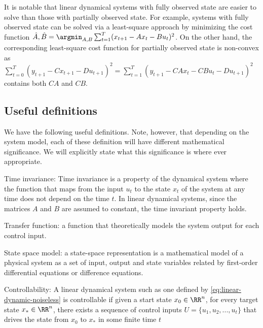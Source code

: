 \documentclass{article}[12pt]
\begin{document}
It is notable that linear dynamical systems with fully observed state are easier to solve than those with partially observed state. For example, systems with fully observed state can be solved via a least-square approach by minimizing the cost function $\hat{A}, \hat{B} = \argmin_{A,B}\sum_{t=1}^T (x_{t+1} - Ax_t - Bu_t)^2$. On the other hand, the corresponding least-square cost function for partially observed state is non-convex as $\sum_{t=0}^T (y_{t+1} - Cx_{t+1} - Du_{t+1})^2 = \sum_{t=1}^T (y_{t+1} - CAx_t - CBu_t - Du_{t+1})^2$ contains both $CA$ and $CB$.

\subsection{Useful definitions}

We have the following useful definitions. Note, however, that depending on the system model, each of these definition will have different mathematical significance. We will explicitly state what this significance is where ever appropriate.

\begin{definition} Time invariance: Time invariance is a property of the dynamical system where the function that maps from the input $u_t$ to the state $x_t$ of the system at any time does not depend on the time $t$. In linear dynamical systems, since the matrices $A$ and $B$ are assumed to constant, the time invariant property holds.
\end{definition}

\begin{definition} Transfer function: a function that theoretically models the system output for each control input.
\end{definition}

\begin{definition} State space model: a state-space representation is a mathematical model of a physical system as a set of input, output and state variables related by first-order differential equations or difference equations.
\end{definition}

\begin{definition} Controllability: A linear dynamical system such as one defined by \eqref{eq:linear-dynamic-noiseless} is controllable if given a start state $x_0 \in \RR^n$, for every target state $x_* \in \RR^n$, there exists a sequence of control inputs $U = \{u_1, u_2, ..., u_t\}$ that drives the state from $x_0$ to $x_*$ in some finite time $t$
\end{definition}
\end{document}
